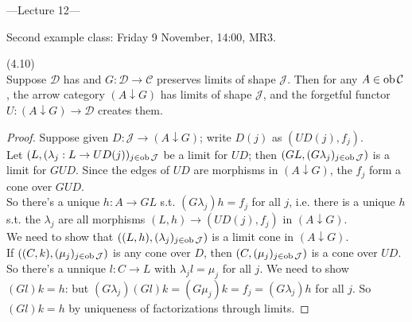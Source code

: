 \documentclass[a4paper]{article}
\begin{document}
---Lecture 12---

Second example class: Friday 9 November, 14:00, MR3.

\begin{lemma} (4.10)\\
    Suppose $\mathcal{D}$ has and $G:\mathcal{D} \to \mathcal{C}$ preserves limits of shape $\mathcal{J}$. Then for any $A \in \operatorname{ob} \mathcal{C}$, the arrow category $(A \downarrow G)$ has limits of shape $\mathcal{J}$, and the forgetful functor $U:(A \downarrow G) \to \mathcal{D}$ creates them.
    \begin{proof}
        Suppose given $D:\mathcal{J} \to (A\downarrow G)$; write $D(j)$ as $(UD(j),f_j)$.\\
        Let $(L,(\lambda_j:L \to UD(j))_{j \in \operatorname{ob}\mathcal{J}}$ be a limit for $UD$; then $(GL,(G\lambda_j)_{j \in \operatorname{ob}\mathcal{J}})$ is a limit for $GUD$. Since the edges of $UD$ are morphisms in $(A \downarrow G)$, the $f_j$ form a cone over $GUD$.\\
        So there's a unique $h:A \to GL$ s.t. $(G\lambda_j)h = f_j$ for all $j$, i.e. there is a unique $h$ s.t. the $\lambda_j$ are all morphisms $(L,h) \to (UD(j),f_j)$ in $(A \downarrow G)$.\\
        We need to show that $((L,h),(\lambda_j)_{j \in \operatorname{ob}\mathcal{J}})$ is a limit cone in $(A \downarrow G)$.\\
        If $((C,k),(\mu_j)_{j \in \operatorname{ob}\mathcal{J}})$ is any cone over $D$, then $(C,(\mu_j)_{j \in \operatorname{ob}\mathcal{J}})$ is a cone over $UD$. So there's a unnique $l:C \to L$ with $\lambda_j l = \mu_j$ for all $j$. We need to show $(Gl)k = h$: but $(G\lambda_j) (Gl)k = (G\mu_j)k = f_j = (G\lambda_j) h$ for all $j$. So $(Gl)k = h$ by uniqueness of factorizations through limits.
    \end{proof}
\end{lemma}
\end{document}
